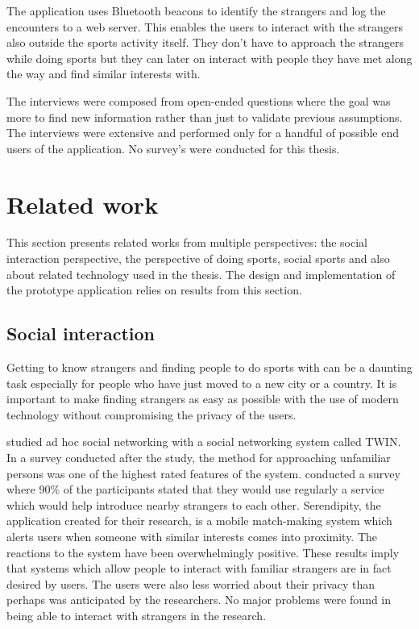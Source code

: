 The application uses Bluetooth beacons to identify the strangers and log the encounters to a web server. This enables the users to interact with the strangers also outside the sports activity itself. They don't have to approach the strangers while doing sports but they can later on interact with people they have met along the way and find similar interests with. 

The interviews were composed from open-ended questions where the goal was more to find new information rather than just to validate previous assumptions. The interviews were extensive and performed only for a handful of possible end users of the application. No survey's were conducted for this thesis.

\section{Related work}

This section presents related works from multiple perspectives: the social interaction perspective, the perspective of doing sports, social sports and also about related technology used in the thesis. The design and implementation of the prototype application relies on results from this section.

\subsection{Social interaction}

Getting to know strangers and finding people to do sports with can be a daunting task especially for people who have just moved to a new city or a country. It is important to make finding strangers as easy as possible with the use of modern technology without compromising the privacy of the users.

\cite{socialAdHoc} studied ad hoc social networking with a social networking system called TWIN. In a survey conducted after the study, the method for approaching unfamiliar persons was one of the highest rated features of the system. \cite{mobileMatchmaking} conducted a survey where 90\% of the participants stated that they would use regularly a service which would help introduce nearby strangers to each other. Serendipity, the application created for their research, is a mobile match-making system which alerts users when someone with similar interests comes into proximity. The reactions to the system have been overwhelmingly positive. These results imply that systems which allow people to interact with familiar strangers are in fact desired by users. The users were also less worried about their privacy than perhaps was anticipated by the researchers. No major problems were found in being able to interact with strangers in the research.

